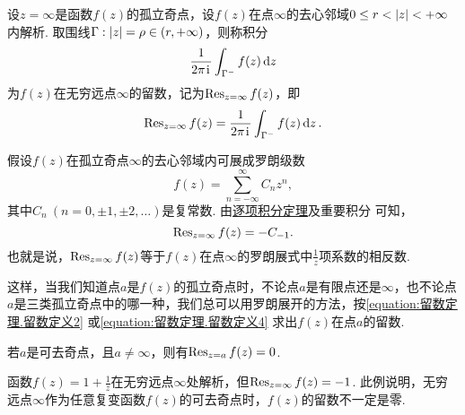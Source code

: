 \begin{definition}
设\(z=\infty\)是函数\(f(z)\)的孤立奇点，设\(f(z)\)在点\(\infty\)的去心邻域\(0 \leq r < \abs{z} < +\infty\)内解析.
取围线\(\Gamma: \abs{z} = \rho\in(r,+\infty)\)，则称积分\[
\frac{1}{2\pi\kern1pt\mathrm{i}\kern1pt} \int_{\Gamma^-} f(z) \dd{z}
\]为\(f(z)\)在无穷远点\(\infty\)的留数，记为\(\operatorname{Res}_{z=\infty} f(z)\)，即\begin{equation}\label{equation:留数定理.留数定义3}
\operatorname{Res}_{z=\infty} f(z)
= \frac{1}{2\pi\kern1pt\mathrm{i}\kern1pt} \int_{\Gamma^-} f(z) \dd{z}.
\end{equation}
\end{definition}
假设\(f(z)\)在孤立奇点\(\infty\)的去心邻域内可展成罗朗级数\[
f(z) = \sum\limits_{n=-\infty}^\infty C_n z^n,
\]其中\(C_n\ (n=0,\pm1,\pm2,\dotsc)\)是复常数.
由\hyperref[theorem:解析函数的级数表示.一致收敛级数的基本性质2]{逐项积分定理}及重要积分  可知，\begin{equation}\label{equation:留数定理.留数定义4}
\operatorname{Res}_{z=\infty} f(z) = - C_{-1}.
\end{equation}
也就是说，\(\operatorname{Res}_{z=\infty} f(z)\)等于\(f(z)\)在点\(\infty\)的罗朗展式中\(\frac{1}{z}\)项系数的相反数.

这样，当我们知道点\(a\)是\(f(z)\)的孤立奇点时，不论点\(a\)是有限点还是\(\infty\)，也不论点\(a\)是三类孤立奇点中的哪一种，我们总可以用罗朗展开的方法，按\cref{equation:留数定理.留数定义2} 或\cref{equation:留数定理.留数定义4} 求出\(f(z)\)在点\(a\)的留数.

\begin{property}
若\(a\)是可去奇点，且\(a\neq\infty\)，则有\(\operatorname{Res}_{z=a} f(z) = 0\).
\end{property}

\begin{example}
函数\(f(z) = 1 + \frac{1}{z}\)在无穷远点\(\infty\)处解析，但\(\operatorname{Res}_{z=\infty} f(z) = -1\).
此例说明，无穷远点\(\infty\)作为任意复变函数\(f(z)\)的可去奇点时，\(f(z)\)的留数不一定是零.
\end{example}

